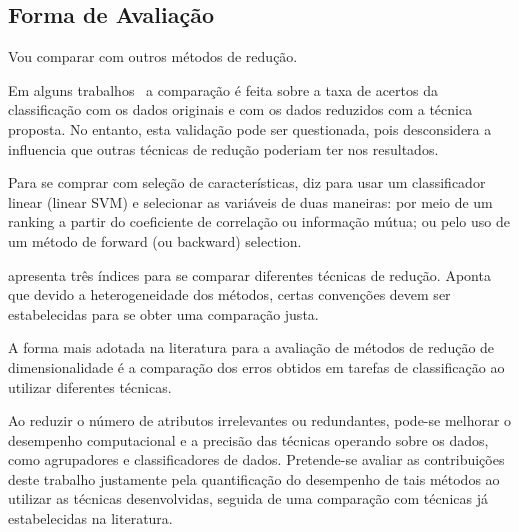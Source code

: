 \subsection{Forma de Avaliação}


Vou comparar com outros métodos de redução.

Em alguns trabalhos~\cite{Joshi2007} a comparação é feita sobre a taxa de acertos da classificação com os dados originais e com os dados reduzidos com a técnica proposta. No entanto, esta validação pode ser questionada, pois desconsidera a influencia que outras técnicas de redução poderiam ter nos resultados.

Para se comprar com seleção de características, \cite{Guyon2003} diz para usar um classificador linear (linear SVM) e selecionar as variáveis de duas maneiras: por meio de um ranking a partir do coeficiente de correlação ou informação mútua; ou pelo uso de um método de forward (ou backward) selection.

\cite{Medeiros2011} apresenta três índices para se comparar diferentes técnicas de redução. Aponta que devido a heterogeneidade dos métodos, certas convenções devem ser estabelecidas para se obter uma comparação justa.

A forma mais adotada na literatura para a avaliação de métodos de redução de dimensionalidade é a comparação dos erros obtidos em tarefas de classificação ao utilizar diferentes técnicas. 

Ao reduzir o número de atributos irrelevantes ou redundantes, pode-se melhorar o desempenho computacional e a precisão das técnicas operando sobre os dados, como agrupadores e classificadores de dados. Pretende-se avaliar as contribuições deste trabalho justamente pela quantificação do desempenho de tais métodos ao utilizar as técnicas desenvolvidas, seguida de uma comparação com técnicas já estabelecidas na literatura.




